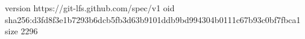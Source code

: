 version https://git-lfs.github.com/spec/v1
oid sha256:d3fd8f3e1b7293b6dcb5fb3d63b9101ddb9bd994304b0111c67b93c0bf7fbca1
size 2296
